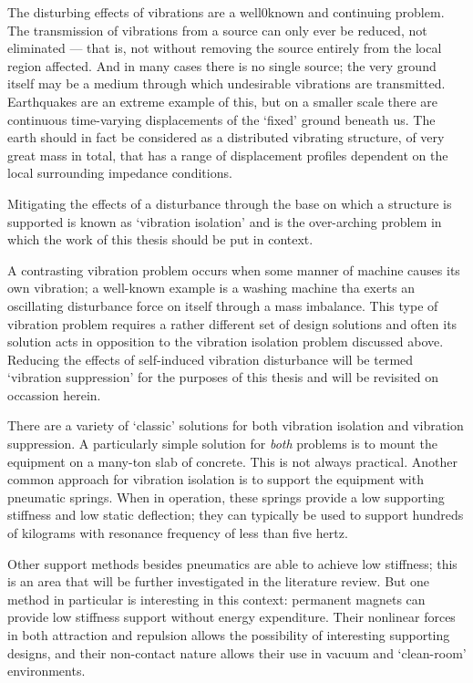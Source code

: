 The disturbing effects of vibrations are a well0known and continuing problem.
The transmission of vibrations from a source can only ever be reduced, not eliminated — that is, not without removing the source entirely from the local region affected. And in many cases there is no single source; the very ground itself may be a medium through which undesirable vibrations are transmitted.
Earthquakes are an extreme example of this, but on a smaller scale there are continuous time-varying displacements of the `fixed' ground beneath us.
The earth should in fact be considered as a distributed vibrating structure, of very great mass in total, that has a range of displacement profiles dependent on the local surrounding impedance conditions. 

Mitigating the effects of a disturbance through the base on which a structure is supported is known as `vibration isolation' and is the over-arching problem in which the work of this thesis should be put in context.

A contrasting vibration problem occurs when some manner of machine causes its own vibration; a well-known example is a washing machine tha exerts an oscillating disturbance force on itself through a mass imbalance. This type of vibration problem requires a rather different set of design solutions and often its solution acts in opposition to the vibration isolation problem discussed above. Reducing the effects of self-induced vibration disturbance will be termed `vibration suppression'
for the purposes of this thesis and will be revisited on occassion herein.

There are a variety of `classic' solutions for both vibration isolation and
vibration suppression. A particularly simple solution for \emph{both} problems is to mount the equipment on a many-ton slab of concrete. This is not always practical. Another common approach for vibration isolation is to support the equipment with pneumatic springs. When in operation, these springs provide a low supporting stiffness and low static deflection; they can typically be used to support hundreds of kilograms with resonance frequency of less than five hertz.

Other support methods besides pneumatics are able to achieve low stiffness; this is an area that will be further investigated in the literature review. But one method in particular is interesting in this context: permanent magnets can provide low stiffness support without energy expenditure. Their nonlinear forces in both attraction and repulsion allows the possibility of interesting supporting designs, and their non-contact nature allows their use in vacuum and `clean-room' environments.

